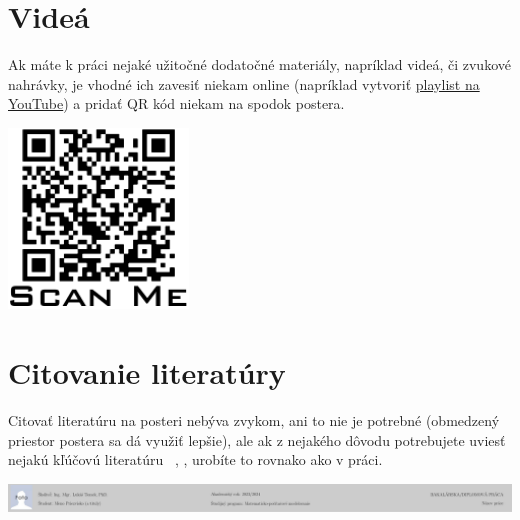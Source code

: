 \documentclass[portrait,a0]{a0poster}
\begin{document}
\begin{multicols}{3}
	
	\section*{Videá}
	
	Ak máte k práci nejaké užitočné dodatočné materiály, napríklad videá, či zvukové nahrávky, je vhodné ich zavesiť niekam online (napríklad vytvoriť \href{https://www.youtube.com/playlist?list=PLI7npCkiqdtxGtS1VIZW3aDIIJM1EJoFR}{playlist na YouTube}) a pridať QR kód niekam na spodok postera.
	\begin{center}
		\includegraphics[height=4.8cm]{figures/QRcode}
		\label{fig:qr}
	\end{center}
	
	
	\section*{Citovanie literatúry}
	
	Citovať literatúru na posteri nebýva zvykom, ani to nie je potrebné (obmedzený priestor postera sa dá využiť lepšie), ale ak z nejakého dôvodu potrebujete uviesť nejakú kľúčovú literatúru ~\cite{eymard}, \cite{Handlovicova}, urobíte to rovnako ako v práci.
	
	\printbibliography

	\end{multicols}
	\vfill

	\centerline{\includegraphics[width=\paperwidth]{footer/footer.pdf}}
\end{document}
